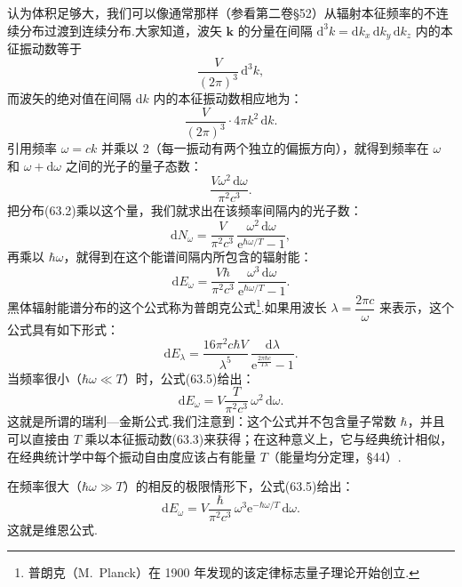 认为体积足够大，我们可以像通常那样（参看第二卷§52）从辐射本征频率的不连续分布过渡到连续分布.大家知道，波矢 $\boldsymbol{k}$ 的分量在间隔 $\mathrm{d}^3k=\mathrm{d}k_x\,\mathrm{d}k_y\,\mathrm{d}k_z$ 内的本征振动数等于
\begin{equation*}
  \frac{V}{(2\pi)^3}\,\mathrm{d}^3k,
\end{equation*}
而波矢的绝对值在间隔 $\mathrm{d}k$ 内的本征振动数相应地为：
\begin{equation*}
  \frac{V}{(2\pi)^3}\cdot4\pi k^2\,\mathrm{d}k.
\end{equation*}
引用频率 $\omega=ck$ 并乘以 2（每一振动有两个独立的偏振方向），就得到频率在 $\omega$ 和 $\omega+\mathrm{d}\omega$ 之间的光子的量子态数：
\begin{equation}
  \frac{V\omega^2\,\mathrm{d}\omega}{\pi^2c^3}.
\end{equation}
把分布(63.2)乘以这个量，我们就求出在该频率间隔内的光子数：
\begin{equation}
  \mathrm{d}N_\omega=\frac{V}{\pi^2c^3}\,
  \frac{\omega^2\,\mathrm{d}\omega}{\mathrm{e}^{\hbar\omega/T}-1},
\end{equation}
再乘以 $\hbar\omega$，就得到在这个能谱间隔内所包含的辐射能：
\begin{equation}
  \mathrm{d}E_\omega=\frac{V\hbar}{\pi^2c^3}\,
  \frac{\omega^3\,\mathrm{d}\omega}{\mathrm{e}^{\hbar\omega/T}-1}.
\end{equation}
黑体辐射能谱分布的这个公式称为普朗克公式\footnote{普朗克（M.~Planck）在 1900 年发现的该定律标志量子理论开始创立.}.如果用波长 $\lambda=\dfrac{2\pi c}{\omega}$ 来表示，这个公式具有如下形式：
\begin{equation}
  \mathrm{d}E_\lambda=\frac{16\pi^2c\hbar V}{\lambda^5}\,
  \frac{\mathrm{d}\lambda}{\mathrm{e}^{\frac{2\pi\hbar c}{T\lambda}}-1}.
\end{equation}
当频率很小（$\hbar\omega\ll T$）时，公式(63.5)给出：
\begin{equation}
  \mathrm{d}E_\omega=V\frac{T}{\pi^2c^3}\,\omega^2\,\mathrm{d}\omega.
\end{equation}
这就是所谓的瑞利—金斯公式.我们注意到：这个公式并不包含量子常数 $\hbar$，并且可以直接由 $T$ 乘以本征振动数(63.3)来获得；在这种意义上，它与经典统计相似，在经典统计学中每个振动自由度应该占有能量 $T$（能量均分定理，§44）.

在频率很大（$\hbar\omega\gg T$）的相反的极限情形下，公式(63.5)给出：
\begin{equation}
  \mathrm{d}E_\omega=V\frac{\hbar}{\pi^2c^3}\,
  \omega^3\mathrm{e}^{-\hbar\omega/T}\,\mathrm{d}\omega.
\end{equation}
这就是维恩公式.

